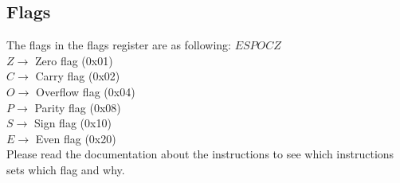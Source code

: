 \subsection{Flags}

The flags in the flags register are as following: $ESPOCZ$ \\

$Z \rightarrow$ Zero flag  (0x01)\\
$C \rightarrow$ Carry flag (0x02)\\
$O \rightarrow$ Overflow flag (0x04)\\
$P \rightarrow$ Parity flag (0x08)\\
$S \rightarrow$ Sign flag (0x10)\\
$E \rightarrow$ Even flag (0x20)\\

Please read the documentation about the instructions to see which instructions sets which flag and why. 
